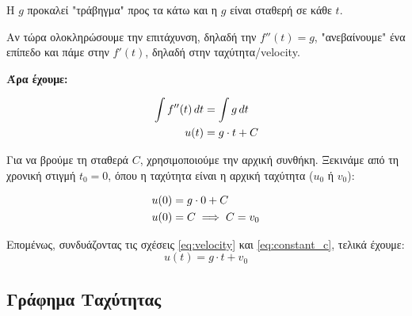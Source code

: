 \documentclass[11pt,a4paper]{article}
\begin{document}
Η $g$ προκαλεί "τράβηγμα" προς τα κάτω και η $g$ είναι σταθερή σε κάθε $t$.

\bigskip
Αν τώρα ολοκληρώσουμε την επιτάχυνση, δηλαδή την $f''(t)=g$, "ανεβαίνουμε" ένα επίπεδο και πάμε στην $f'(t)$, δηλαδή στην ταχύτητα/velocity.

\bigskip
\textbf{Άρα έχουμε:}

\begin{align}
    \int f''(t) \, dt &= \int g \, dt \notag \\
    u(t) &= g \cdot t + C \label{eq:velocity}
\end{align}

\vspace{5pt}
Για να βρούμε τη σταθερά $C$, χρησιμοποιούμε την αρχική συνθήκη.
Ξεκινάμε από τη χρονική στιγμή $t_0 = 0$, όπου η ταχύτητα είναι η αρχική ταχύτητα ($u_0$ ή $v_0$):

\begin{align}
    u(0) &= g \cdot 0 + C \notag \\
    u(0) &= C \implies C = v_0 \label{eq:constant_c}
\end{align}

Επομένως, συνδυάζοντας τις σχέσεις \eqref{eq:velocity} και \eqref{eq:constant_c}, τελικά έχουμε:
\begin{equation*}
    u(t) = g \cdot t + v_0
\end{equation*}

\subsection*{Γράφημα Ταχύτητας}

\begin{center}
\end{center}
\end{document}
